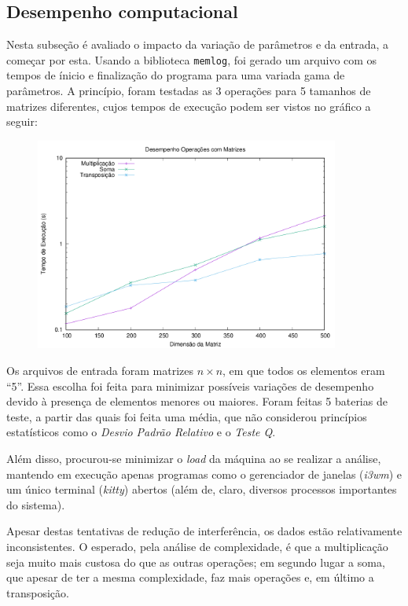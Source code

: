 \documentclass{article}
\def\code#1{\texttt{#1}}
\begin{document}
\subsection{Desempenho computacional}

Nesta subseção é avaliado o impacto da variação de parâmetros e da entrada, a começar por esta. Usando a biblioteca \code{memlog}, foi gerado um arquivo com os tempos de ínicio e finalização do programa para uma variada gama de parâmetros. A princípio, foram testadas as 3 operações para 5 tamanhos de matrizes diferentes, cujos tempos de execução podem ser vistos no gráfico a seguir:

\begin{figure} [H]
    \includegraphics[width=10cm]{params-perf.png} 
    \centering
\end{figure}

Os arquivos de entrada foram matrizes \( n \times n \), em que todos os elementos eram ``5''. Essa escolha foi feita para minimizar possíveis variações de desempenho devido à presença de elementos menores ou maiores. Foram feitas 5 baterias de teste, a partir das quais foi feita uma média, que não considerou princípios estatísticos como o \textit{Desvio Padrão Relativo} e o \textit{Teste Q}.

Além disso, procurou-se minimizar o \textit{load} da máquina ao se realizar a análise, mantendo em execução apenas programas como o gerenciador de janelas (\textit{i3wm}) e um único terminal (\textit{kitty}) abertos (além de, claro, diversos processos importantes do sistema).

Apesar destas tentativas de redução de interferência, os dados estão relativamente inconsistentes. O esperado, pela análise de complexidade, é que a multiplicação seja muito mais custosa do que as outras operações; em segundo lugar a soma, que apesar de ter a mesma complexidade, faz mais operações e, em último a transposição.
\end{document}
